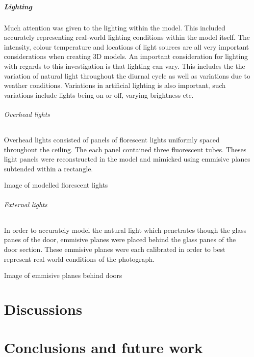 \documentclass[11pt,a4paper]{report}
\begin{document}
				\paragraph{Lighting}
				Much attention was given to the lighting within the model. This included accurately representing real-world lighting conditions within the model itself. The intensity, colour temperature and locations of light sources are all very important considerations when creating 3D models.
				An important consideration for lighting with regards to this investigation is that lighting can vary. This includes the the variation of natural light throughout the diurnal cycle as well as variations due to weather conditions. Variations in artificial lighting is also important, such variations include lights being on or off, varying brightness etc.
				\subparagraph{Overhead lights}
					Overhead lights consisted of panels of florescent lights uniformly spaced throughout the ceiling. The each panel contained three fluorescent tubes. Theses light panels were reconstructed in the model and mimicked using emmisive planes subtended within a rectangle.
					
					{{Image of modelled florescent lights}}
				
				\subparagraph{External lights}
					In order to accurately model the natural light which penetrates though the glass panes of the door, emmisive planes were placed behind the glass panes of the door section. These emmisive planes were each calibrated in order to best represent real-world conditions of the photograph.
					
					{{Image of emmisive planes behind doors}}
				

\chapter{Discussions}

\chapter{Conclusions and future work}

\newpage
\printbibliography
\end{document}
